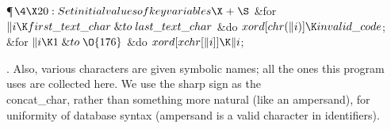 \Y\P$\4\X20:Set initial values of key variables\X\mathrel{+}\S$\6
\&{for} $\|i\K\\{first\_text\_char}\mathrel{\&{to}}\\{last\_text\_char}$ \1%
\&{do}\5
$\\{xord}[\\{chr}(\|i)]\K\\{invalid\_code}$;\2\6
\&{for} $\|i\K1\mathrel{\&{to}}\O{176}$ \1\&{do}\5
$\\{xord}[\\{xchr}[\|i]]\K\|i$;\2\par
\fi

.
Also, various characters are given symbolic names; all the ones this
program uses are collected here.  We use the sharp sign as the
\\{concat\_char}, rather than something more natural (like an ampersand),
for uniformity of database syntax (ampersand is a valid character in
identifiers).

